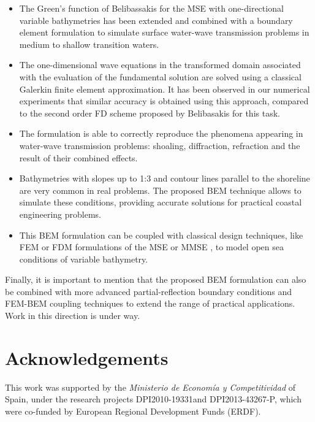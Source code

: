 \begin{itemize}
\item The Green's function of Belibassakis \cite{Belibassakis2000} for the MSE with one-directional variable bathymetries has been extended and combined with a boundary element formulation to simulate surface water-wave transmission problems in medium to shallow transition waters.

\item The one-dimensional wave equations in the transformed domain associated with the evaluation of the fundamental solution are solved using a classical Galerkin finite element approximation. It has been observed in our numerical experiments that similar accuracy is obtained using this approach, compared to the second order FD scheme proposed by Belibasakis \cite{Belibassakis2000} for this task.

\item The formulation is able to correctly reproduce the phenomena appearing in water-wave transmission problems: shoaling, diffraction, refraction and the result of their combined effects.

\item Bathymetries with slopes up to 1:3 and contour lines parallel to the shoreline are very common in real problems. The proposed BEM technique allows to simulate these conditions, providing accurate solutions for practical coastal engineering problems.

\item This BEM formulation can be coupled with classical design techniques, like FEM or FDM formulations of the MSE or MMSE \cite{Naserizadeh2011}, to model open sea conditions of variable bathymetry.

\end{itemize}

Finally, it is important to mention that the proposed BEM formulation can also be combined with more advanced partial-reflection boundary conditions and FEM-BEM coupling techniques to extend the range of practical applications. Work in this direction is under way.

\section{Acknowledgements}
This work was supported by the \emph{Ministerio de Econom\'{i}a y Competitividad} of Spain, under the research projects DPI2010-19331and DPI2013-43267-P, which were co-funded by European Regional Development Funds (ERDF).




%





